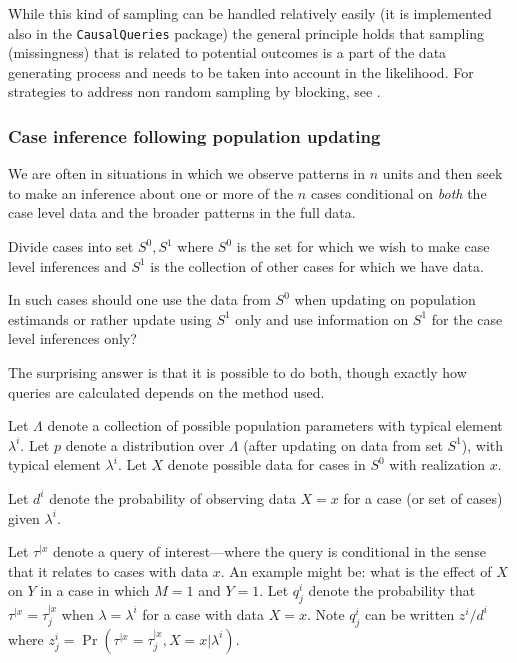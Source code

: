 \documentclass[
  12pt,
]{book}
\begin{document}
While this kind of sampling can be handled relatively easily (it is implemented also in the \texttt{CausalQueries} package) the general principle holds that sampling (missingness) that is related to potential outcomes is a part of the data generating process and needs to be taken into account in the likelihood. For strategies to address non random sampling by blocking, see \citet{bareinboim2016causal}.

\hypertarget{case-inference-following-population-updating}{%
\subsubsection{Case inference following population updating}\label{case-inference-following-population-updating}}

We are often in situations in which we observe patterns in \(n\) units and then seek to make an inference about one or more of the \(n\) cases conditional on \emph{both} the case level data and the broader patterns in the full data.

Divide cases into set \(S^0, S^1\) where \(S^0\) is the set for which we wish to make case level inferences and \(S^1\) is the collection of other cases for which we have data.

In such cases should one use the data from \(S^0\) when updating on population estimands or rather update using \(S^1\) only and use information on \(S^1\) for the case level inferences only?

The surprising answer is that it is possible to do both, though exactly how queries are calculated depends on the method used.

Let \(\Lambda\) denote a collection of possible population parameters with typical element \(\lambda^i\). Let \(p\) denote a distribution over \(\Lambda\) (after updating on data from set \(S^1\)), with typical element \(\lambda^i\). Let \(X\) denote possible data for cases in \(S^0\) with realization \(x\).

Let \(d^i\) denote the probability of observing data \(X = x\) for a case (or set of cases) given \(\lambda^i\).

Let \(\tau^{|x}\) denote a query of interest---where the query is conditional in the sense that it relates to cases with data \(x\). An example might be: what is the effect of \(X\) on \(Y\) in a case in which \(M=1\) and \(Y=1\). Let \(q^i_j\) denote the probability that \(\tau^{|x} = \tau_j^{|x}\) when \(\lambda = \lambda^i\) for a case with data \(X=x\). Note \(q^i_j\) can be written \(z^i/d^i\) where \(z^i_j = \Pr(\tau^{|x} = \tau^{|x}_j, X=x | \lambda^i)\).
\end{document}
